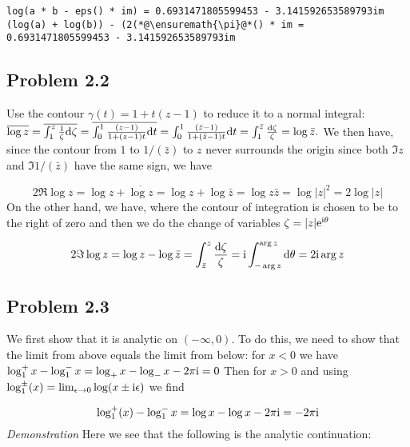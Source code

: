 \documentclass[12pt,a4paper]{article}
\def\D{ {\rm d} }
\def\I{ {\rm i} }
\def\E{ {\rm e} }
\def\dt{\D t}
\begin{document}
\begin{lstlisting}
log(a * b - eps() * im) = 0.6931471805599453 - 3.141592653589793im
(log(a) + log(b)) - (2(*@\ensuremath{\pi}@*() * im = 0.6931471805599453 - 3.141592653589793im
\end{lstlisting}


\subsection{Problem 2.2}
Use the contour $\gamma(t) = 1 + t(z-1)$ to reduce it to a normal integral: $\overline{\log z } = \overline{\int_1^z {1 \over \zeta} \D \zeta} = \overline{\int_0^1 {(z-1) \over 1+(z-1) t} \dt}  = \int_0^1 {(\bar z-1) \over 1+(\bar z-1) t} \dt = \int_1^{\bar z} {\D \zeta \over \zeta} = \log \bar z.$ We then have, since the contour from $1$ to $1/(\bar z)$ to $z$ never surrounds the origin since both $\Im z$ and $\Im 1/(\bar z)$ have the same sign, we have

\[
2 \Re \log z = \log z + \overline{\log z} = \log z + \log \bar z = \log z \bar z = \log |z|^2 = 2 \log |z|
\]
On the other hand, we have, where the contour of integration is chosen to be to the right of zero and then we do the change of variables $\zeta = |z| \E^{\I \theta}$

\[
2 \Im \log z = \log z - \log \bar z = \int_{\bar z}^z {\D \zeta \over \zeta} = \I \int_{-\arg z}^{\arg z} \D \theta = 2 \I \arg z
\]
\subsection{Problem 2.3}
We first show that it is analytic on $(-\infty,0)$. To do this, we need to show that the limit from above equals the limit from below: for $x < 0$ we have $\log_1^+ x -\log_1^- x = \log_+x - \log_- x -2 \pi \I = 0$ Then for $x > 0$ and using $\log_1^\pm(x) = \lim_{\epsilon\rightarrow 0} \log(x\pm \I \epsilon)$ we find

\[
\log_1^+(x) - \log_1^-x = \log x- \log x- 2\pi \I = -2 \pi \I
\]
\emph{Demonstration} Here we see that the following is the analytic continuation:
\end{document}

